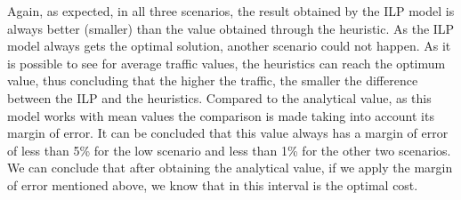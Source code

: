 Again, as expected, in all three scenarios, the result obtained by the ILP model is always better (smaller) than the value obtained through the heuristic. As the ILP model always gets the optimal solution, another scenario could not happen. As it is possible to see for average traffic values, the heuristics can reach the optimum value, thus concluding that the higher the traffic, the smaller the difference between the ILP and the heuristics. Compared to the analytical value, as this model works with mean values the comparison is made taking into account its margin of error. It can be concluded that this value always has a margin of error of less than 5\% for the low scenario and less than 1\% for the other two scenarios. We can conclude that after obtaining the analytical value, if we apply the margin of error mentioned above, we know that in this interval is the optimal cost.
